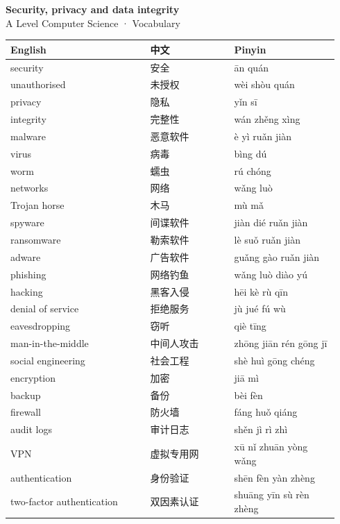 \documentclass[11pt]{article}
\begin{document}
\begin{center}
  {\LARGE\bfseries Security, privacy and data integrity}\\[0.35em]
  {\large A Level Computer Science · Vocabulary}
\end{center}
\vspace{0.6em}

\begin{longtable}{@{}p{0.40\linewidth}p{0.24\linewidth}p{0.30\linewidth}@{}}
\toprule
\textbf{English} & \textbf{中文} & \textbf{Pinyin} \\
\midrule
\endhead
\bottomrule
\endlastfoot
security & 安全 & ān quán \\
unauthorised & 未授权 & wèi shòu quán \\
privacy & 隐私 & yǐn sī \\
integrity & 完整性 & wán zhěng xìng \\
malware & 恶意软件 & è yì ruǎn jiàn \\
virus & 病毒 & bìng dú \\
worm & 蠕虫 & rú chóng \\
networks & 网络 & wǎng luò \\
Trojan horse & 木马 & mù mǎ \\
spyware & 间谍软件 & jiàn dié ruǎn jiàn \\
ransomware & 勒索软件 & lè suǒ ruǎn jiàn \\
adware & 广告软件 & guǎng gào ruǎn jiàn \\
phishing & 网络钓鱼 & wǎng luò diào yú \\
hacking & 黑客入侵 & hēi kè rù qīn \\
denial of service & 拒绝服务 & jù jué fú wù \\
eavesdropping & 窃听 & qiè tīng \\
man-in-the-middle & 中间人攻击 & zhōng jiān rén gōng jī \\
social engineering & 社会工程 & shè huì gōng chéng \\
encryption & 加密 & jiā mì \\
backup & 备份 & bèi fèn \\
firewall & 防火墙 & fáng huǒ qiáng \\
audit logs & 审计日志 & shěn jì rì zhì \\
VPN & 虚拟专用网 & xū nǐ zhuān yòng wǎng \\
authentication & 身份验证 & shēn fèn yàn zhèng \\
two-factor authentication & 双因素认证 & shuāng yīn sù rèn zhèng \\

\end{longtable}
\end{document}
